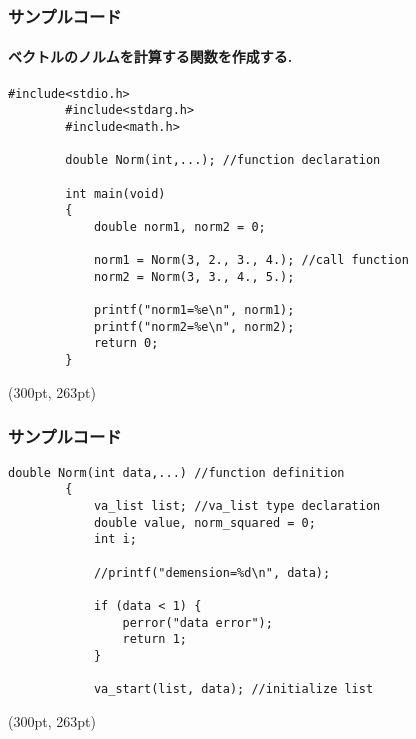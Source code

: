 \documentclass[dvipdfmx]{beamer}
\begin{document}
\begin{frame}[t, fragile]
    \frametitle{サンプルコード}
    \framesubtitle{ベクトルのノルムを計算する関数を作成する.}
    \vspace{-10pt}
    \begin{lstlisting}[gobble=8, caption=pra\_func.c]
        #include<stdio.h>
        #include<stdarg.h>
        #include<math.h>

        double Norm(int,...); //function declaration

        int main(void)
        {
            double norm1, norm2 = 0;

            norm1 = Norm(3, 2., 3., 4.); //call function
            norm2 = Norm(3, 3., 4., 5.);

            printf("norm1=%e\n", norm1);
            printf("norm2=%e\n", norm2);
            return 0;
        }
    \end{lstlisting}
    \begin{textblock*}{0.3\linewidth}(300pt, 263pt)
    \space
    \end{textblock*}
\end{frame}

\begin{frame}[t, fragile]
    \frametitle{サンプルコード}
    \begin{lstlisting}[gobble=8, firstnumber=18, caption=pra\_func.c]
        double Norm(int data,...) //function definition
        {
            va_list list; //va_list type declaration
            double value, norm_squared = 0;
            int i;

            //printf("demension=%d\n", data);

            if (data < 1) {
                perror("data error");
                return 1;
            }

            va_start(list, data); //initialize list

    \end{lstlisting}
    \begin{textblock*}{0.3\linewidth}(300pt, 263pt)
    \space
    \end{textblock*}
\end{frame}
\end{document}
